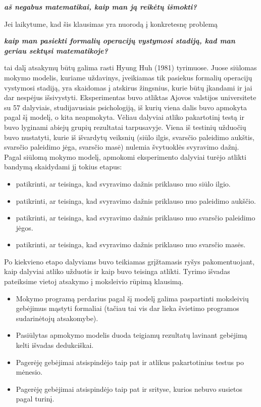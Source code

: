\documentclass{article}
\begin{document}
\begin{center}\textbf{\textit{aš negabus matematikai, kaip man ją reikėtų išmokti?}}\end{center}

Jei laikytume, kad šis klausimas yra nuorodą į konkretesnę problemą 

\begin{center}\textbf{\textit{kaip man pasiekti formalių operacijų vystymosi stadiją, kad man geriau sektųsi matematikoje?}}\end{center}

tai dalį atsakymų būtų galima rasti Hyung Huh (1981) tyrimuose. Juose siūlomas mokymo modelis, kuriame uždavinys, įveikiamas tik pasiekus formalių operacijų vystymosi stadiją, yra skaidomas į atskirus žingsnius, kurie būtų įkandami ir jai dar nespėjus išsivystyti. Eksperimentas buvo atliktas Ajovos valstijos universitete su 57 dalyviais, studijavusiais psichologiją, iš kurių viena dalis buvo apmokyta pagal šį modelį, o kita neapmokyta. Vėliau dalyviai atliko pakartotinį testą ir buvo lyginami abiejų grupių rezultatai tarpusavyje. Viena iš testinių užduočių buvo nustatyti, kurie iš išvardytų veiksnių (siūlo ilgis, svarsčio paleidimo aukštis, svarsčio paleidimo jėga, svarsčio masė) nulemia švytuoklės svyravimo dažnį. Pagal siūlomą mokymo modelį, apmokomi eksperimento dalyviai turėjo atlikti bandymą skaidydami jį tokius etapus:

\begin{itemize}
\item patikrinti, ar teisinga, kad svyravimo dažnis priklauso nuo siūlo ilgio.
\item patikrinti, ar teisinga, kad svyravimo dažnis priklauso nuo paleidimo aukščio.
\item patikrinti, ar teisinga, kad svyravimo dažnis priklauso nuo svarsčio paleidimo jėgos.
\item patikrinti, ar teisinga, kad svyravimo dažnis priklauso nuo svarsčio masės.
\end{itemize}

Po kiekvieno etapo dalyviams buvo teikiamas grįžtamasis ryšys pakomentuojant, kaip dalyviai atliko užduotis ir kaip buvo teisinga atlikti. Tyrimo išvadas pateiksime vietoj atsakymo į moksleivio rūpimą klausimą.

\begin{itemize}
\item Mokymo programą perdarius pagal šį modelį galima paspartinti moksleivių gebėjimus mąstyti formaliai (tačiau tai vis dar lieka švietimo programos sudarinėtojų atsakomybe).
\item Pasiūlytas apmokymo modelis duoda teigiamų rezultatų lavinant gebėjimą kelti išvadas dedukciškai.
\item Pagerėję gebėjimai atsispindėjo taip pat ir atlikus pakartotinius testus po mėnesio.
\item Pagerėję gebėjimai atsispindėjo taip pat ir srityse, kurios nebuvo susietos pagal turinį.
\end{itemize}
\end{document}
